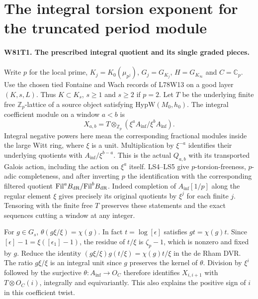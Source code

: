 \section{The integral torsion exponent for the truncated period module}

\paragraph{W81T1. The prescribed integral quotient and its single graded pieces.}
Write $p$ for the local prime, $K_j=K_0(\mu_{p^j})$,
$G_j=G_{K_j}$, $H=G_{K_\infty}$ and $C=\mathbb C_p$. Use the
chosen tied Fontaine and Wach records of L78W13 on a good layer
$(K,s,L)$. Thus $K\subset K_s$, $s\ge1$ and $s\ge2$ if $p=2$.
Let $T$ be the underlying finite free $\mathbb Z_p$-lattice of
a source object satisfying $\mathrm{HypW}(M_0,h_0)$.
The integral coefficient module on a window $a<b$ is
\[
 X_{a,b}=T\otimes_{\mathbb Z_p}
         (\xi^a A_{\inf}/\xi^b A_{\inf}).
\]
Integral negative powers here mean the corresponding fractional
modules inside the large Witt ring, where $\xi$ is a unit.
Multiplication by $\xi^{-a}$ identifies their underlying quotients
with $A_{\inf}/\xi^{b-a}$. This is the actual $Q_{a,b}$ with its
transported Galois action, including the action on $\xi^a$ itself.
LS4--LS5 give $p$-torsion-freeness, $p$-adic completeness, and
after inverting $p$ the identification with the corresponding
filtered quotient $\mathrm{Fil}^aB_{\rm dR}/\mathrm{Fil}^bB_{\rm dR}$.
Indeed completion of $A_{\inf}[1/p]$ along the regular element
$\xi$ gives precisely its original quotients by $\xi^j$ for each
finite $j$. Tensoring with the finite free $T$ preserves these
statements and the exact sequences cutting a window at any integer.

For $g\in G_s$, $\theta(g\xi/\xi)=\chi(g)$. In fact
$t=\log[\epsilon]$ satisfies $gt=\chi(g)t$. Since
$[\epsilon]-1=\xi([\epsilon_1]-1)$, the residue of $t/\xi$ is
$\zeta_p-1$, which is nonzero and fixed by $g$. Reduce the identity
$(g\xi/\xi)g(t/\xi)=\chi(g)t/\xi$ in the de Rham DVR.
The ratio $g\xi/\xi$ is an integral unit since $g$ preserves the
kernel of $\theta$. Division by $\xi^i$ followed by the
surjective $\theta:A_{\inf}\to O_C$ therefore identifies
$X_{i,i+1}$ with $T\otimes O_C(i)$, integrally and equivariantly.
This also explains the positive sign of $i$ in this coefficient twist.

